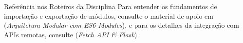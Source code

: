 \vspace{1.0em}
\begin{dica}{Referência nos Roteiros da Disciplina}
Para entender os fundamentos de importação e exportação de módulos, consulte o material de apoio em  (\textit{Arquitetura Modular com ES6 Modules}), e para os detalhes da integração com APIs remotas, consulte  (\textit{Fetch API \& Flask}).
\end{dica}


